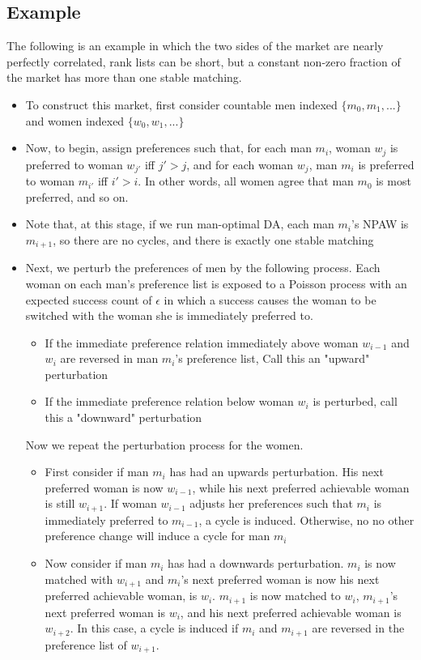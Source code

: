 \documentclass[WP]{AEA}
\begin{document}
\subsection{Example }
The following is an example in which the two sides of the market are nearly perfectly correlated, rank lists can be short, but a constant non-zero fraction of the market has more than one stable matching.
\begin{itemize}
	\item To construct this market, first consider countable men indexed $\{ m_0, m_1, ...\}$ and women indexed $\{ w_0, w_1, ...\}$
	
	\item Now, to begin, assign preferences such that, for each man $m_i$, woman $w_j$ is preferred to woman $w_{j'}$ iff $j' > j$, and for each woman $w_j$, man $m_i$ is preferred to woman $m_{i'}$ iff $i' > i$.  In other words, all women agree that man $m_0$ is most preferred, and so on. 
	
	\item Note that, at this stage, if we run man-optimal DA, each man $m_i$'s NPAW is $m_{i+1}$, so there are no cycles, and there is exactly one stable matching
	
	\item Next, we perturb the preferences of men by the following process.  Each woman on each man's preference list is exposed to a Poisson process with an expected success count of $\epsilon$ in which a success causes the woman to be switched with the woman she is immediately preferred to.
	
	\begin{itemize}
		\item If the immediate preference relation immediately above woman $w_{i-1}$  and $w_i$ are reversed in man $m_i$'s preference list, Call this an "upward" perturbation
		
		\item If the immediate preference relation below woman $w_i$ is perturbed, call this a "downward" perturbation
		
	\end{itemize}

	Now we repeat the perturbation process for the women. 
	
	\begin{itemize}
		\item First consider if man $m_i$ has had an upwards perturbation.  His next preferred woman is now $w_{i-1}$, while his next preferred achievable woman is still $w_{i+1}$. If woman $w_{i-1}$ adjusts her preferences such that $m_i$ is immediately preferred to $m_{i-1}$, a cycle is induced. Otherwise, no no other preference change will induce a cycle for man $m_i$
		\item Now consider if man $m_i$ has had a downwards perturbation. $m_i$ is now matched with $w_{i+1}$ and $m_i$'s next preferred woman is now his next preferred achievable woman, is $w_i$. $m_{i+1}$ is now matched to $w_i$,  $m_{i+1}$'s next preferred woman is $w_i$, and his next preferred achievable woman is $w_{i+2}$.   In this case, a cycle is induced if $m_i$ and $m_{i+1}$ are reversed in the preference list of $w_{i+1} $. 
	\end{itemize}


\end{itemize}
\end{document}
